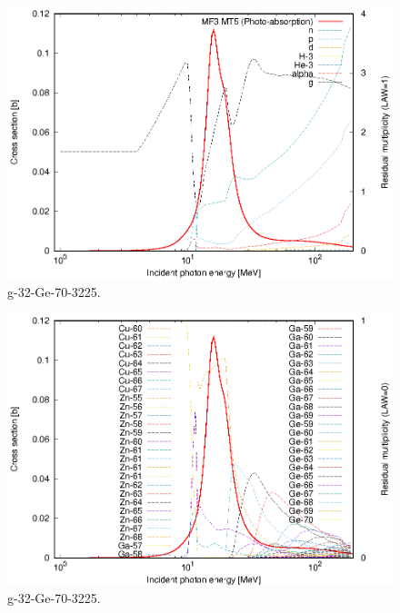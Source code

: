 \begin{figure}
 \includegraphics[width=\linewidth]{eps/g_32-Ge-70_3225.eps}
  \caption{g-32-Ge-70-3225.}
\end{figure}
\begin{figure}
 \includegraphics[width=\linewidth]{eps-law0/g_32-Ge-70_3225.eps}
 \caption{g-32-Ge-70-3225.}
\end{figure}
\newpage \clearpage

